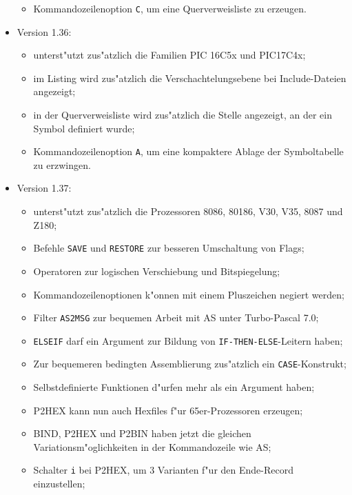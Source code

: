 \documentclass[12pt,a4paper,twoside]{report}
\newcommand{\tty}[1]{{\tt #1}}
\begin{document}
\begin{itemize}
{\begin{itemize}
{            belegte Speicherbereiche abgepr"uft;}
      \item{Kommandozeilenoption \tty{C}, um eine Querverweisliste zu erzeugen.}
      \end{itemize}}
\item{Version 1.36:
      \begin{itemize}
      \item{unterst"utzt zus"atzlich die Familien PIC 16C5x und
            PIC17C4x;}
      \item{im Listing wird zus"atzlich die Verschachtelungsebene bei
            Include-Dateien angezeigt;}
      \item{in der Querverweisliste wird zus"atzlich die Stelle angezeigt,
            an der ein Symbol definiert wurde;}
      \item{Kommandozeilenoption \tty{A}, um eine kompaktere Ablage der
            Symboltabelle zu erzwingen.}
      \end{itemize}}
\item{Version 1.37:
      \begin{itemize}
      \item{unterst"utzt zus"atzlich die Prozessoren 8086, 80186, V30,
            V35, 8087 und Z180;}
      \item{Befehle \tty{SAVE} und \tty{RESTORE} zur besseren Umschaltung
            von Flags;}
      \item{Operatoren zur logischen Verschiebung und Bitspiegelung;}
      \item{Kommandozeilenoptionen k"onnen mit einem Pluszeichen negiert
            werden;}
      \item{Filter \tty{AS2MSG} zur bequemen Arbeit mit AS unter Turbo-Pascal 7.0;}
      \item{\tty{ELSEIF} darf ein Argument zur Bildung von
            \tty{IF-THEN-ELSE}-Leitern haben;}
      \item{Zur bequemeren bedingten Assemblierung zus"atzlich ein
            \tty{CASE}-Konstrukt;}
      \item{Selbstdefinierte Funktionen d"urfen mehr als ein Argument haben;}
      \item{P2HEX kann nun auch Hexfiles f"ur 65er-Prozessoren erzeugen;}
      \item{BIND, P2HEX und P2BIN haben jetzt die gleichen
            Variationsm"oglichkeiten in der Kommandozeile wie AS;}
      \item{Schalter \tty{i} bei P2HEX, um 3 Varianten f"ur den Ende-Record
            einzustellen;}

\end{itemize}}
\end{itemize}
\end{document}
